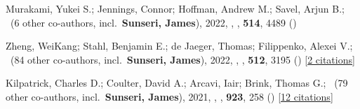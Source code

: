 \item Murakami, Yukei S.; Jennings, Connor; Hoffman, Andrew M.; Savel, Arjun B.; \etal\ ({6} other co-authors, incl.\ \textbf{Sunseri, James}), 2022, , \mnras, \textbf{514}, 4489 ()

\item Zheng, WeiKang; Stahl, Benjamin E.; de Jaeger, Thomas; Filippenko, Alexei V.; \etal\ ({84} other co-authors, incl.\ \textbf{Sunseri, James}), 2022, , \mnras, \textbf{512}, 3195 () [\href{https://ui.adsabs.harvard.edu/abs/2022MNRAS.512.3195Z}{2 citations}]

\item Kilpatrick, Charles D.; Coulter, David A.; Arcavi, Iair; Brink, Thomas G.; \etal\ ({79} other co-authors, incl.\ \textbf{Sunseri, James}), 2021, , \apj, \textbf{923}, 258 () [\href{https://ui.adsabs.harvard.edu/abs/2021ApJ...923..258K}{12 citations}]